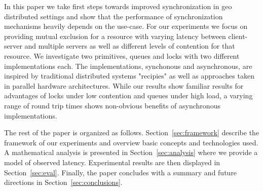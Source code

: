 In this paper we take first steps towards improved synchronization in geo distributed settings and show that the performance of synchronization mechanisms heavily depends on the use-case. For our experiments we focus on providing mutual exclusion for a resource with varying latency between client-server and multiple servers as well as different levels of contention for that resource. We investigate two primitives, queues and locks with two different implementations each. The implementations, synchonous and asynchronous, are inspired by traditional distributed systems "recipies" as well as approaches taken in parallel hardware architectures. While our results show familiar results for advantages of locks under low contention and queues under high load, a varying range of round trip times shows non-obvious benefits of asynchronous implementations.

The rest of the paper is organized as follows. Section~\ref{sec:framework} describe the framework of our experiments and overview basic concepts and technologies used. A mathematical analysis is presented in Section~\ref{sec:analysis} where we provide a model of observed latency. Experimental results are then displayed in Section~\ref{sec:eval}. Finally, the paper concludes with a summary and future directions in Section~\ref{sec:conclusions}.